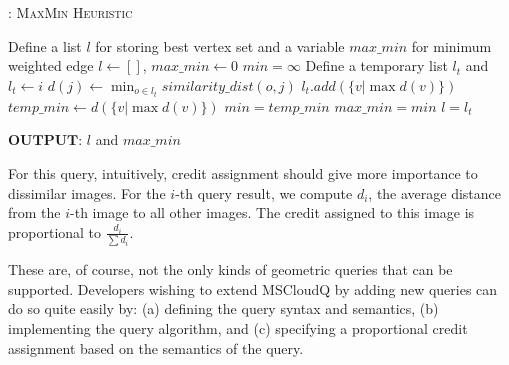 \begin{algorithm}[H]
\caption{: \textsc{MaxMin Heuristic}} \label{alg:mst}
\begin{small}
\begin{algorithmic}[1]
\STATE Define a list $l$ for storing best vertex set and a variable $max\_min$ for minimum weighted edge
\STATE $l\leftarrow []$, $max\_min \leftarrow 0$
        \STATE $min=\infty$
        \STATE Define a temporary list $l_t$ and $l_t \leftarrow i$
                \STATE $d(j) \leftarrow \min_{o \in l_t} similarity\_dist(o,j)$
            \ENDFOR
                \STATE $l_t.add(\{v | \max {d(v)}\})$
                \STATE  $temp\_min\leftarrow d(\{v | \max {d(v)}\})$
            \ENDIF
            \STATE $min = temp\_min$
        \ENDIF
        \ENDWHILE
                \STATE $max\_min=min$
                \STATE $l=l_t$
        \ENDIF
\ENDFOR
\end{algorithmic}
\end{small}
$\textbf{OUTPUT}$: $l$ and $max\_min$
\end{algorithm}

For this query, intuitively, credit assignment should give more
importance to dissimilar images.
%
For the $i$-th query result, we compute $d_i$, the average distance from
the $i$-th image to all other images.
%
The credit assigned to this image is proportional to
$\frac{d_i}{\sum{d_i}}$.

%
These are, of course, not the only kinds of geometric queries that can
be supported.
%
Developers wishing to extend MSCloudQ by adding new queries can do so
quite easily by: (a) defining the query syntax and semantics, (b)
implementing the query algorithm, and (c) specifying a proportional
credit assignment based on the semantics of the query.

